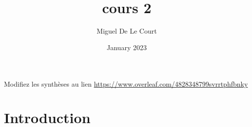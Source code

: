 \documentclass{article}
\title{cours 2}
\author{Miguel De Le Court}
\date{January 2023}
\begin{document}
\maketitle
Modifiez les synthèses au lien \url{https://www.overleaf.com/4828348799svrrtphfbnky}
\section{Introduction}
\end{document}
